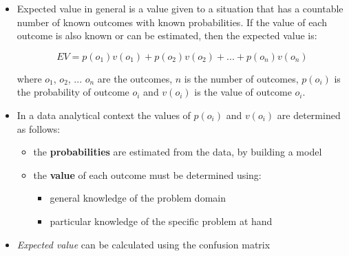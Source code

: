 \newpage

\begin{itemize}
\item Expected value in general is a value given to a situation that has a countable number of known outcomes with known probabilities. If the value of each outcome is also known or can be estimated, then the expected value is:

  $$EV=p(o_1)v(o_1)+p(o_2)v(o_2)+...+p(o_n)v(o_n)$$

  where $o_1$, $o_2$, ... $o_n$ are the outcomes, $n$ is the number of outcomes, $p(o_i)$ is the probability of outcome $o_i$ and $v(o_i)$ is the value of outcome $o_i$.
  \item In a data analytical context the values of $p(o_i)$ and $v(o_i)$ are determined as follows:
  \begin{itemize}
  \item the \textbf{probabilities} are estimated from the data, by building a model
  \item the \textbf{value} of each outcome must be determined using:
    \begin{itemize}
    \item general knowledge of the problem domain
    \item particular knowledge of the specific problem at hand
    \end{itemize}
  \end{itemize}

  \newpage

\item \emph{Expected value} can be calculated using the confusion matrix


\end{itemize}
